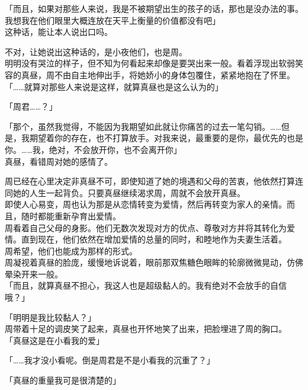 「而且，如果对那些人来说，我是不被期望出生的孩子的话，那也是没办法的事。我想我在他们眼里大概连放在天平上衡量的价值都没有吧」\\

这种话，能让本人说出口吗。

不对，让她说出这种话的，是小夜他们，也是周。\\

明明没有哭泣的样子，但不知为何看起来却像是要哭出来一般。看着浮现出软弱笑容的真昼，周不由自主地伸出手，将她娇小的身体包覆住，紧紧地抱在了怀里。\\

「……就算对那些人来说是这样，就算真昼也是这么认为的」

「周君……？」

「那个，虽然我觉得，不能因为我期望如此就让你痛苦的过去一笔勾销。……但是，我期望着你的存在，也不打算放手。对我来说，最重要的是你，最优先的也是你。……我，绝对，不会放开你，也不会离开你」\\

真昼，看错周对她的感情了。

周已经在心里决定非真昼不可，即使知道了她的境遇和父母的苦衷，他依然打算连同她的人生一起背负。只要真昼继续渴求周，周就不会放开真昼。\\

即使人心易变，周也认为那是从恋情转变为爱情，然后再转变为家人的亲情。而且，随时都能重新孕育出爱情。\\

周看着自己父母的身影。他们无数次发现对方的优点、尊敬对方并将其转化为爱情。直到现在，他们依然在增加爱情的总量的同时，和睦地作为夫妻生活着。\\

周希望，他们也能成为那样的形式。\\

周凝视着真昼的脸庞，缓慢地诉说着，眼前那双焦糖色眼眸的轮廓微微晃动，仿佛晕染开来一般。\\

「而且，就算真昼不担心，我这人也是超级黏人的。我有绝对不会放手的自信哦？」

「明明是我比较黏人？」\\

周带着十足的调皮笑了起来，真昼也开怀地笑了出来，把脸埋进了周的胸口。\\

「真昼这是在小看我的爱」

「……我才没小看呢。倒是周君是不是小看我的沉重了？」

「真昼的重量我可是很清楚的」

